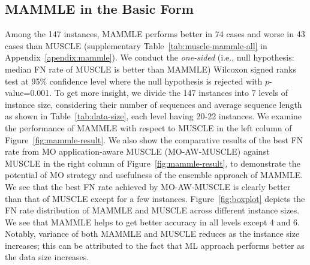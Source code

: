 

\subsection{MAMMLE in the Basic Form}
Among the 147 instances, MAMMLE performs better in 74 cases and worse in 43 cases than MUSCLE (supplementary Table~\ref{tab:muscle-mammle-all} in Appendix~\ref{apendix:mammle}). We conduct the \textit{one-sided} (i.e., null hypothesis: median FN rate of MUSCLE is better than MAMMLE) Wilcoxon signed ranks test at 95\% confidence level where the null hypothesis is rejected with $p$-value=0.001. To get more insight, we divide the 147 instances into 7 levels of instance size, considering their number of sequences and average sequence length as shown in Table~\ref{tab:data-size}, each level having 20-22 instances. We examine the performance of MAMMLE with respect to MUSCLE in the left column of Figure~\ref{fig:mammle-result}. We also show the comparative results of the best FN rate from MO application-aware MUSCLE (MO-AW-MUSCLE) against MUSCLE in the right column of Figure~\ref{fig:mammle-result}, to demonstrate the potential of MO strategy and usefulness of the ensemble approach of MAMMLE. We see that the best FN rate achieved by MO-AW-MUSCLE is clearly better than that of MUSCLE except for a few instances.
Figure~\ref{fig:boxplot} depicts the FN rate distribution of MAMMLE and MUSCLE across different instance sizes. We see that MAMMLE helps to get better accuracy in all levels except 4 and 6. Notably, variance of both MAMMLE and MUSCLE reduces as the instance size increases; this can be attributed to the fact that ML approach performs better as the data size increases. 

